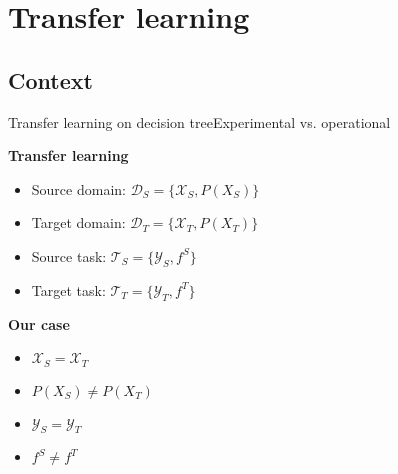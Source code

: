 \section{Transfer learning}
\subsection{Context}

\begin{frame}{Transfer learning on decision tree}{Experimental vs. operational}
\begin{minipage}[t]{0.49\linewidth}
    \vspace{0pt}
    \textbf{Transfer learning}
    \begin{itemize}
        \item Source domain: $\mathcal{D}_{S} = \{\mathcal{X}_{S}, P(X_{S})\}$\\
        \item Target domain: $\mathcal{D}_{T} = \{\mathcal{X}_{T}, P(X_{T})\}$\\
        \item Source task: $\mathcal{T}_{S} = \{\mathcal{Y}_{S}, f^S\}$\\
        \item Target task: $\mathcal{T}_{T} = \{\mathcal{Y}_{T}, f^T\}$\\
    \end{itemize}
\end{minipage}
\begin{minipage}[t]{0.49\linewidth}
    \vspace{0pt}
    \textbf{Our case}
    \begin{itemize}%
        \item $\mathcal{X}_{S} = \mathcal{X}_{T}$
        \item \textcolor{myorange}{$P(X_{S}) \neq P(X_{T})$}
        \item $\mathcal{Y}_{S} = \mathcal{Y}_{T}$
        \item \textcolor{myorange}{$f^S \neq f^T$}
    \end{itemize}
\end{minipage}

\bigskip


\end{frame}

